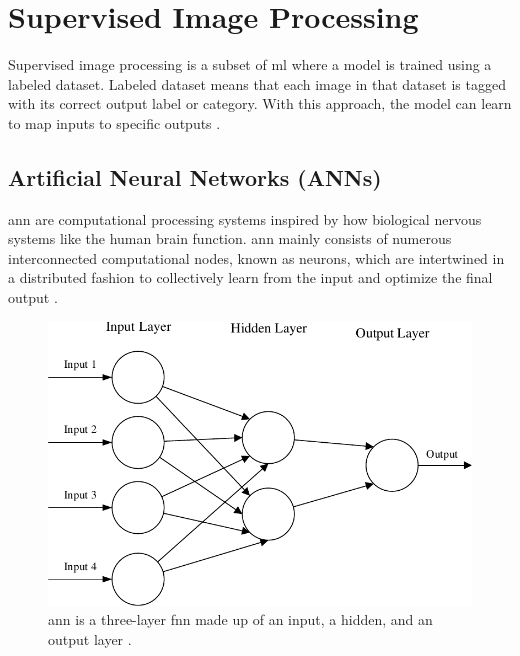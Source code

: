 

\section{Supervised Image Processing}
\label{sec:supervised}

Supervised image processing is a subset of \gls{ml} where a model is trained using a labeled dataset. Labeled dataset means that each image in that dataset is tagged with its correct output label or category. With this approach, the model can learn to map inputs to specific outputs \cite{geeksforgeeks-sup-unsup}.

\subsection{Artificial Neural Networks (ANNs)}

\gls{ann} are computational processing systems inspired by how biological nervous systems like the human brain function. \gls{ann} mainly consists of numerous interconnected computational nodes, known as neurons, which are intertwined in a distributed fashion to collectively learn from the input and optimize the final output \cite{oshea2015introductionconvolutionalneuralnetworks}.

\begin{figure}[ht!]
    \centering
    \includegraphics[width=1\linewidth]{Images/ann_architecture.pdf}
    \caption{\gls{ann} is a three-layer \gls{fnn} made up of an input, a hidden, and an output layer \cite{oshea2015introductionconvolutionalneuralnetworks}.}
    \label{fig:ann architecture}
\end{figure}

